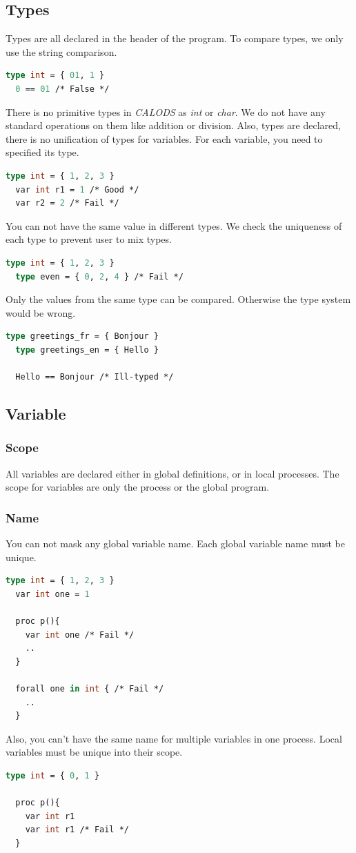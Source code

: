 \documentclass{article}
\begin{document}
\subsection{Types}
Types are all declared in the header of the program. To compare types, we only use the string comparison.  
\begin{lstlisting}[language=ML]
  type int = { 01, 1 }
  0 == 01 /* False */
\end{lstlisting}
There is no primitive types in \textit{CALODS} as \textit{int} or \textit{char}. We do not have any standard operations on them like addition or division. Also, types are declared, there is no unification of types for variables. For each variable, you need to specified its type.
\begin{lstlisting}[language=ML]
  type int = { 1, 2, 3 }
  var int r1 = 1 /* Good */
  var r2 = 2 /* Fail */
\end{lstlisting} 
You can not have the same value in different types. We check the uniqueness of each type to prevent user to mix types.
\begin{lstlisting}[language=ML]
  type int = { 1, 2, 3 }
  type even = { 0, 2, 4 } /* Fail */
\end{lstlisting}
Only the values from the same type can be compared. Otherwise the type system would be wrong.
\begin{lstlisting}[language=ML]
  type greetings_fr = { Bonjour }
  type greetings_en = { Hello }

  Hello == Bonjour /* Ill-typed */
\end{lstlisting}
    
    
    
\subsection{Variable}
\subsubsection{Scope}
All variables are declared either in global definitions, or in local processes. The scope for variables are only the process or the global program.
      
\subsubsection{Name}
You can not mask any global variable name. Each global variable name must be unique.
\begin{lstlisting}[language=ML]
  type int = { 1, 2, 3 }
  var int one = 1

  proc p(){
    var int one /* Fail */
    ..
  }

  forall one in int { /* Fail */
    ..
  }
\end{lstlisting}
Also, you can't have the same name for multiple variables in one process. Local variables must be unique into their scope.
\begin{lstlisting}[language=ML]
  type int = { 0, 1 }

  proc p(){
    var int r1
    var int r1 /* Fail */
  }
\end{lstlisting}
     
\end{document}
